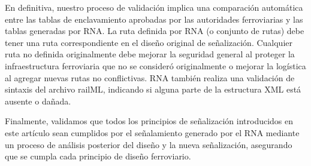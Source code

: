     En definitiva, nuestro proceso de validación implica una comparación automática entre las tablas de enclavamiento aprobadas por las autoridades ferroviarias y las tablas generadas por RNA. La ruta definida por RNA (o conjunto de rutas) debe tener una ruta correspondiente en el diseño original de señalización. Cualquier ruta no definida originalmente debe mejorar la seguridad general al proteger la infraestructura ferroviaria que no se consideró originalmente o mejorar la logística al agregar nuevas rutas no conflictivas. RNA también realiza una validación de sintaxis del archivo railML, indicando si alguna parte de la estructura XML está ausente o dañada. 
    
    Finalmente, validamos que todos los principios de señalización introducidos en este artículo sean cumplidos por el señalamiento generado por el RNA mediante un proceso de análisis posterior del diseño y la nueva señalización, asegurando que se cumpla cada principio de diseño ferroviario.
